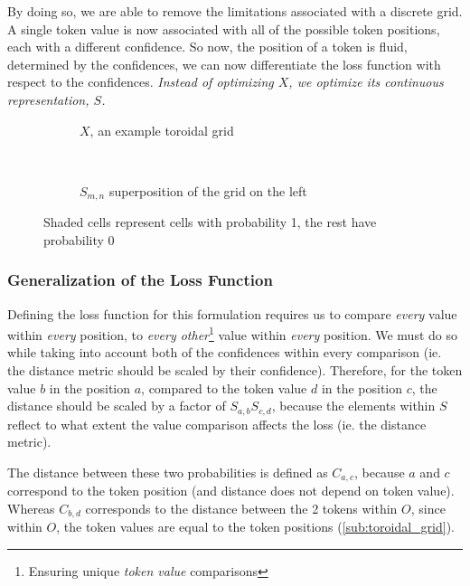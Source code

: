 By doing so, we are able to remove the limitations associated with a discrete grid. A single token value is now associated with all of the possible token positions, each with a different confidence. So now, the position of a token is fluid, determined by the confidences, we can now differentiate the loss function with respect to the confidences. \emph{Instead of optimizing $X$, we optimize its continuous representation, $S$.}

\begin{figure}[htpb]
    \centering
    \begin{subfigure}[t]{0.5\textwidth}
    \begin{center}
    \end{center}
    \caption{$X$, an example toroidal grid}
    \end{subfigure}%
    ~
    \begin{subfigure}[t]{0.5\textwidth}
    \begin{center}
    \end{center}
    \caption{$S_{m,n}$ superposition of the grid on the left}
    \label{fig:superpositionShade}
    \end{subfigure}

    \caption{Shaded cells represent cells with probability 1, the rest have probability 0}
    \label{fig:superpositionExample}
\end{figure}

\subsubsection{Generalization of the Loss Function}%
\label{ssub:generalization_of_the_loss_function}

Defining the loss function for this formulation requires us to compare \emph{every} value within \emph{every} position, to \emph{every other}\footnote{Ensuring unique \emph{token value} comparisons} value within \emph{every} position. We must do so while taking into account both of the confidences within every comparison (ie. the distance metric should be scaled by their confidence). Therefore, for the token value $b$ in the position $a$, compared to the token value $d$ in the position $c$, the distance should be scaled by a factor of $S_{a,b}S_{c,d}$, because the elements within $S$ reflect to what extent the value comparison affects the loss (ie. the distance metric).

The distance between these two probabilities is defined as $C_{a,c}$, because $a$ and $c$ correspond to the token position (and distance does not depend on token value). Whereas $C_{b,d}$ corresponds to the distance between the 2 tokens within $O$, since within $O$, the token values are equal to the token positions (\ref{sub:toroidal_grid}).

